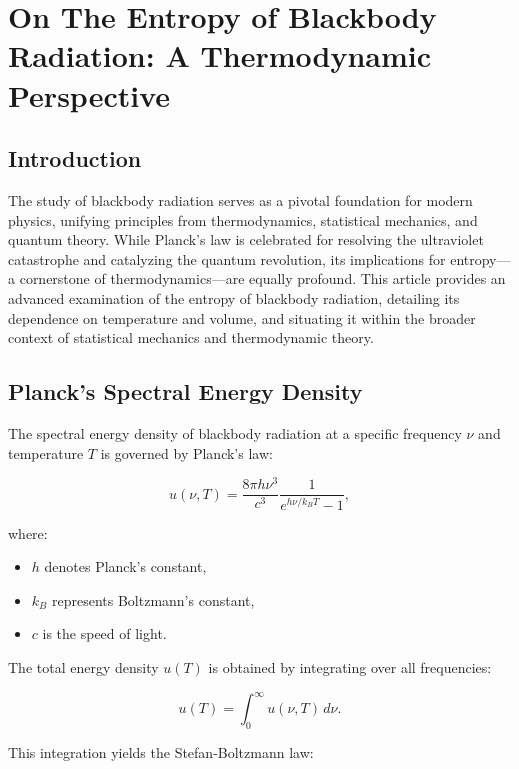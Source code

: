 

 \section{On The Entropy of Blackbody Radiation: A Thermodynamic Perspective}

 \subsection*{Introduction}
 The study of blackbody radiation serves as a pivotal foundation for modern physics, unifying principles from thermodynamics, statistical mechanics, and quantum theory. While Planck's law is celebrated for resolving the ultraviolet catastrophe and catalyzing the quantum revolution, its implications for entropy—a cornerstone of thermodynamics—are equally profound. This article provides an advanced examination of the entropy of blackbody radiation, detailing its dependence on temperature and volume, and situating it within the broader context of statistical mechanics and thermodynamic theory.

 \subsection*{Planck's Spectral Energy Density}
 The spectral energy density of blackbody radiation at a specific frequency $\nu$ and temperature $T$ is governed by Planck's law:

 \begin{equation*}
  u(\nu, T) = \frac{8 \pi h \nu^3}{c^3} \frac{1}{e^{h \nu / k_B T} - 1},
 \end{equation*}

 where:

 \begin{itemize}
  \item $h$ denotes Planck's constant,
  \item $k_B$ represents Boltzmann's constant,
  \item $c$ is the speed of light.
 \end{itemize}

 The total energy density $u(T)$ is obtained by integrating over all frequencies:

 \begin{equation*}
  u(T) = \int_0^\infty u(\nu, T) \, d\nu.
 \end{equation*}

 This integration yields the Stefan-Boltzmann law:

